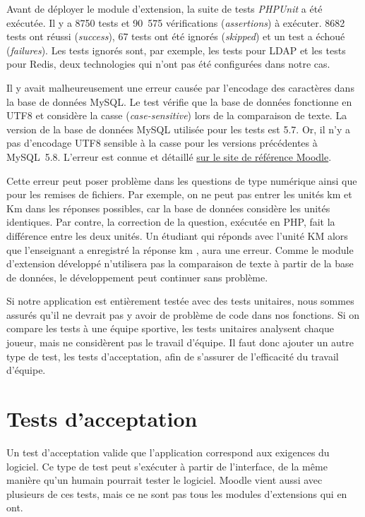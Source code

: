 Avant de déployer le module d'extension, la suite de tests \textit{PHPUnit} a été exécutée.
Il y a 8750 tests et 90~575 vérifications (\textit{assertions}) à exécuter.
8682 tests ont réussi (\textit{success}), 67 tests ont été ignorés (\textit{skipped}) et un test a échoué (\textit{failures}).
Les tests ignorés sont, par exemple, les tests pour LDAP et les tests pour Redis, deux technologies qui n'ont pas été configurées dans notre cas.

Il y avait malheureusement une erreur causée par l'encodage des caractères dans la base de données MySQL.
Le test vérifie que la base de données fonctionne en UTF8 et considère la casse (\textit{case-sensitive}) lors de la comparaison de texte.
La version de la base de données MySQL utilisée pour les tests est 5.7.
Or, il n'y a pas d'encodage UTF8 sensible à la casse pour les versions précédentes à MySQL~5.8.
L'erreur est connue et détaillé \href{https://docs.moodle.org/dev/Database_collation_issue}{sur le site de référence Moodle}.

Cette erreur peut poser problème dans les questions de type numérique ainsi que pour les remises de fichiers.
Par exemple, on ne peut pas entrer les unités \og km \fg{} et \og Km \fg{} dans les réponses possibles, car la base de données considère les unités identiques.
Par contre, la correction de la question, exécutée en PHP, fait la différence entre les deux unités.
Un étudiant qui réponds avec l'unité  KM \fg{} alors que l'enseignant a enregistré la réponse  km \fg{}, aura une erreur.
Comme le module d'extension développé n'utilisera pas la comparaison de texte à partir de la base de données, le développement peut continuer sans problème.

Si notre application est entièrement testée avec des tests unitaires, nous sommes assurés qu'il ne devrait pas y avoir de problème de code dans nos fonctions.
Si on compare les tests à une équipe sportive, les tests unitaires analysent chaque joueur, mais ne considèrent pas le travail d'équipe.
Il faut donc ajouter un autre type de test, les tests d'acceptation, afin de s'assurer de l'efficacité du travail d'équipe.

\section{Tests d'acceptation}

Un test d'acceptation valide que l'application correspond aux exigences du logiciel.
Ce type de test peut s'exécuter à partir de l'interface, de la même manière qu'un humain pourrait tester le logiciel.
Moodle vient aussi avec plusieurs de ces tests, mais ce ne sont pas tous les modules d'extensions qui en ont.

